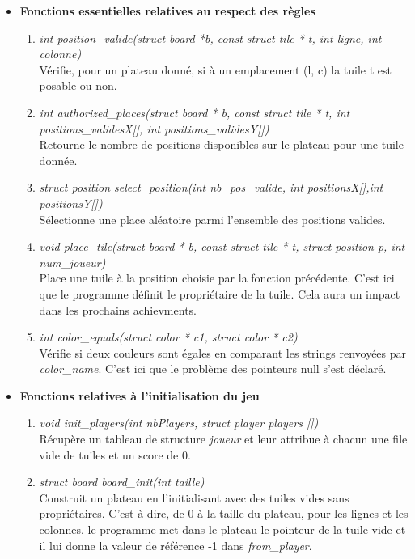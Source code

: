 \documentclass[a4paper]{article}
\begin{document}
\begin{itemize}
    \item \textbf{Fonctions essentielles relatives au respect des règles}
    \begin{enumerate}
        \item \emph{int position\_valide(struct board *b, const struct tile * t, int ligne, int colonne)} \\
    Vérifie, pour un plateau donné, si à un emplacement (l, c) la tuile t est posable ou non.

        \item \emph{int authorized\_places(struct board * b, const struct tile * t, int positions\_validesX[], int positions\_validesY[])} \\
    Retourne le nombre de positions disponibles sur le plateau pour une tuile donnée.
    
        \item \emph{struct position select\_position(int nb\_pos\_valide, int positionsX[],int positionsY[])} \\
    Sélectionne une place aléatoire parmi l'ensemble des positions valides.
    
        \item \emph{void place\_tile(struct board * b, const struct tile * t, struct position p, int num\_joueur)} \\
    Place une tuile à la position choisie par la fonction précédente. C'est ici que le programme définit le propriétaire de la tuile. Cela aura un impact dans les prochains achievments.
    
        \item \emph{int color\_equals(struct color * c1, struct color * c2)} \\
    Vérifie si deux couleurs sont égales en comparant les strings renvoyées par \emph{color\_name}. C'est ici que le problème des pointeurs null s'est déclaré. \\
    \end{enumerate}

    \item \textbf{Fonctions relatives à l'initialisation du jeu}
    \begin{enumerate}
    \item \emph{void init\_players(int nbPlayers, struct player players [])} \\
    Récupère un tableau de structure \emph{joueur} et leur attribue à chacun une file vide de tuiles et un score de 0.
    
        \item \emph{struct board board\_init(int taille)} \\
    Construit un plateau en l'initialisant avec des tuiles vides sans propriétaires. C'est-à-dire, de 0 à la taille du plateau, pour les lignes et les colonnes, le programme met dans le plateau le pointeur de la tuile vide et il lui donne la valeur de référence -1 dans \emph{from\_player}. \\
    \end{enumerate}
\end{itemize}
\end{document}
